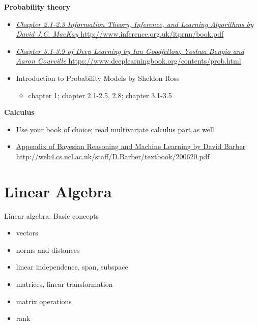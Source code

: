 \documentclass[ignorenonframetext,]{beamer}
\providecommand{\tightlist}{%
  \setlength{\itemsep}{0pt}\setlength{\parskip}{0pt}}
\begin{document}
\begin{frame}{}
\protect\hypertarget{section}{}

\textbf{Probability theory}

\begin{itemize}
\tightlist
\item
  \href{http://www.inference.org.uk/itprnn/book.pdf}{\emph{Chapter
  2.1-2.3 Information Theory, Inference, and Learning Algorithms by
  David J.C. MacKay} http://www.inference.org.uk/itprnn/book.pdf}
\item
  \href{https://www.deeplearningbook.org/contents/prob.html}{\emph{Chapter
  3.1-3.9 of Deep Learning by Ian Goodfellow, Yoshua Bengio and Aaron
  Courville} https://www.deeplearningbook.org/contents/prob.html}
\item
  Introduction to Probability Models by Sheldon Ross

  \begin{itemize}
  \tightlist
  \item
    chapter 1; chapter 2.1-2.5, 2.8; chapter 3.1-3.5
  \end{itemize}
\end{itemize}

\textbf{Calculus}

\begin{itemize}
\tightlist
\item
  Use your book of choice; read multivariate calculus part as well
\item
  \href{http://web4.cs.ucl.ac.uk/staff/D.Barber/textbook/200620.pdf}{Appendix
  of Bayesian Reasoning and Machine Learning by David Barber
  http://web4.cs.ucl.ac.uk/staff/D.Barber/textbook/200620.pdf}
\end{itemize}

\end{frame}

\hypertarget{linear-algebra}{%
\section{Linear Algebra}\label{linear-algebra}}

\begin{frame}{Linear algebra: Basic concepts}
\protect\hypertarget{linear-algebra-basic-concepts}{}

\begin{itemize}
\tightlist
\item
  vectors \bigskip
\item
  norms and distances \bigskip
\item
  linear independence, span, subspace \bigskip
\item
  matrices, linear transformation \bigskip
\item
  matrix operations \bigskip
\item
  rank
\end{itemize}

\end{frame}
\end{document}
